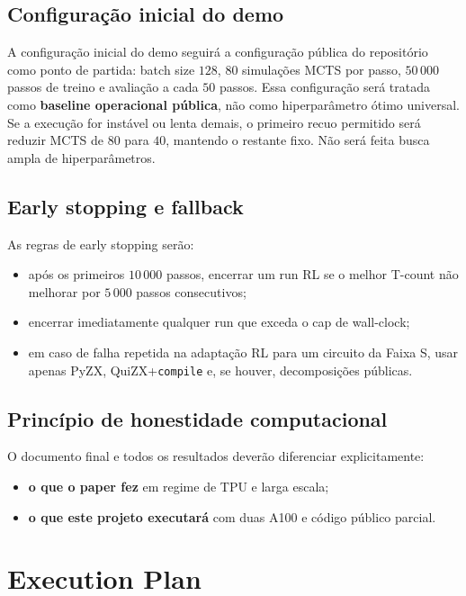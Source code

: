 \documentclass[a4paper,11pt]{article}
\begin{document}
\subsection*{Configuração inicial do demo}

A configuração inicial do demo seguirá a configuração pública do repositório como ponto de partida: batch size $128$, $80$ simulações MCTS por passo, $50\,000$ passos de treino e avaliação a cada $50$ passos. Essa configuração será tratada como \textbf{baseline operacional pública}, não como hiperparâmetro ótimo universal. Se a execução for instável ou lenta demais, o primeiro recuo permitido será reduzir MCTS de $80$ para $40$, mantendo o restante fixo. Não será feita busca ampla de hiperparâmetros.

\subsection*{Early stopping e fallback}

As regras de early stopping serão:
\begin{itemize}
  \item após os primeiros $10\,000$ passos, encerrar um run RL se o melhor T-count não melhorar por $5\,000$ passos consecutivos;
  \item encerrar imediatamente qualquer run que exceda o cap de wall-clock;
  \item em caso de falha repetida na adaptação RL para um circuito da Faixa S, usar apenas PyZX, QuiZX+\texttt{compile} e, se houver, decomposições públicas.
\end{itemize}

\subsection*{Princípio de honestidade computacional}

O documento final e todos os resultados deverão diferenciar explicitamente:
\begin{itemize}
  \item \textbf{o que o paper fez} em regime de TPU e larga escala;
  \item \textbf{o que este projeto executará} com duas A100 e código público parcial.
\end{itemize}

\section{Execution Plan}
\end{document}
